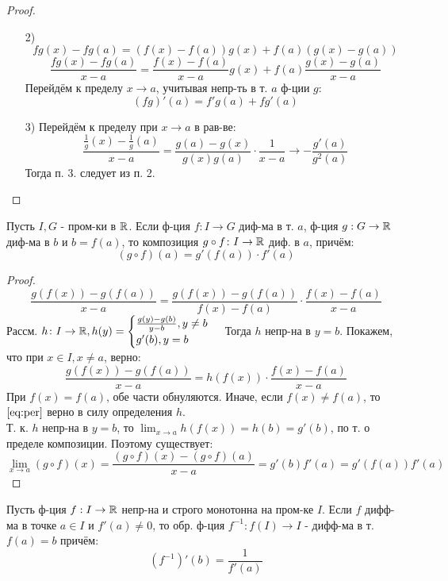 \begin{proof}
  \begin{itemize}
    \item [2) ]
\[
fg(x) - fg(a) = (f(x) - f(a))g(x) + f(a)(g(x) - g(a))
\]
\[
  \frac{fg(x) - fg(a)}{x - a} = \frac{f(x) - f(a)}{x - a} g(x) + f(a) \frac{g(x) - g(a)}{x - a}
\]
Перейдём к пределу $x \rightarrow a$, учитывая непр-ть в т. $a$ ф-ции $g$:
\[
  (fg)'(a) = f'g(a) + fg'(a)
\]
\item [3) ] Перейдём к пределу при $x \rightarrow a$ в рав-ве:
  \[
    \frac{\frac{1}{g}(x) - \frac{1}{g}(a)}{x - a} = \frac{g(a) - g(x)}{g(x)g(a)} \cdot \frac{1}{x - a} \rightarrow -\frac{g'(a)}{g^{2}(a)}
  \]
  Тогда п. 3. следует из п. 2.
  \end{itemize}
\end{proof}
\begin{theorem}
Пусть $I, G$ - пром-ки в $\mathbb{R}$. Если ф-ция $f: I \rightarrow G$ диф-ма в т. $a$, ф-ция $g: G \rightarrow \mathbb{R}$ диф-ма в $b$ и $b = f(a)$, то композиция $g \circ f \colon I \rightarrow \mathbb{R}$ диф. в $a$, причём:
\[
  (g \circ f)(a) = g'(f(a)) \cdot f'(a)
\]
\end{theorem}
\begin{proof}
\[
  \frac{g(f(x)) - g(f(a))}{x - a} = \frac{g(f(x)) - g(f(a))}{f(x) - f(a)} \cdot \frac{f(x) - f(a)}{x - a}
\]
Рассм. $h\colon I \rightarrow \mathbb{R}, h(y) = \begin{cases}
  \frac{g(y) - g(b)}{y - b}, y \neq b \\
  g'(b), y = b
\end{cases}$
Тогда $h$ непр-на в $y = b$. Покажем, что при $x \in I, x \neq a$, верно:
\begin{equation}
  \label{eq:per}
  \frac{g(f(x)) - g(f(a))}{x - a} = h(f(x)) \cdot \frac{f(x) - f(a)}{x - a}
\end{equation}
При $f(x) = f(a)$, обе части обнуляются. Иначе, если $f(x) \neq f(a)$, то $\ref{eq:per}$ верно в силу определения $h$. \\
Т. к. $h$ непр-на в $y = b$, то $\lim_{x\to a} h(f(x)) = h(b) = g'(b)$, по т. о пределе композиции. Поэтому существует:
\[
\lim_{x\to a} (g \circ f)(x) = \frac{(g \circ f)(x) - (g \circ f)(a)}{x - a} = g'(b)f'(a) = g'(f(a))f'(a)
\]
\end{proof}
\begin{theorem}
Пусть ф-ция $f: I \rightarrow \mathbb{R}$ непр-на и строго монотонна на пром-ке $I$. Если $f$ дифф-ма в точке $a \in I$ и $f'(a) \neq 0$, то обр. ф-ция $f^{-1} \colon f(I) \rightarrow I$ - дифф-ма в т. $f(a) = b$ причём:
\[
  (f^{-1})'(b) = \frac{1}{f'(a)}
\]
\end{theorem}

